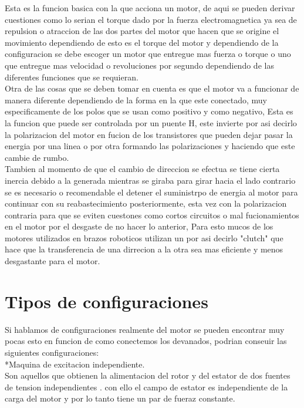 \documentclass[12pt]{article}
\begin{document}
Esta es la funcion basica con la que acciona un motor, de aqui se pueden derivar cuestiones como lo serian el torque dado por la fuerza electromagnetica ya sea de repulsion o atraccion de las dos partes del motor que hacen que se origine el movimiento dependiendo de esto es el torque del motor y dependiendo de la configuracion se debe escoger un motor que entregue mas fuerza o torque o uno que entregue mas velocidad o revoluciones por segundo dependiendo de las diferentes funciones que se requieran.\\

Otra de las cosas que se deben tomar en cuenta es que el motor va a funcionar de manera diferente dependiendo de la forma en la que este conectado, muy especificamente de los polos que se usan como positivo y como negativo, Esta es la funcion que puede ser controlada por un puente H, este invierte por asi decirlo la polarizacion del motor en fucion de los transistores que pueden dejar pasar la energia por una linea o por otra formando las polarizaciones y haciendo que este cambie de rumbo.\\

Tambien al momento de que el cambio de direccion se efectua se tiene cierta inercia debido a la generada mientras se giraba para girar hacia el lado contrario se es necesario o recomendable el detener el suministrpo de energia al motor para continuar con su reabastecimiento posteriormente, esta vez con la polarizacion contraria para que se eviten cuestones como cortos circuitos o mal fucionamientos en el motor por el desgaste de no hacer lo anterior, Para esto mucos de los motores utilizados en brazos roboticos utilizan un por asi decirlo "clutch" que hace que la transferencia de una dirrecion a la otra sea mas eficiente y menos desgastante para el motor.\\

\section{Tipos de configuraciones }

Si hablamos de configuraciones realmente del motor se pueden encontrar muy pocas esto en funcion de como conectemos los devanados, podrian conseuir las siguientes configuraciones:\\

*Maquina de excitacion independiente.\\
Son aquellos que obtienen la alimentacion del rotor y del estator de dos fuentes de tension independientes . con ello el campo de estator es independiente de la carga del motor y por lo tanto tiene un par de fueraz constante.\\
\end{document}
